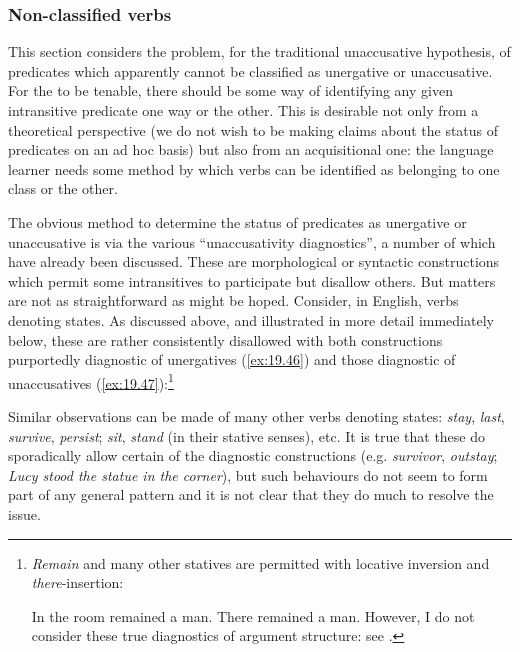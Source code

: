 \documentclass[output=paper]{langsci/langscibook}
\begin{document}
\subsubsection{Non-classified verbs}\label{sec:baker:3.4.4}

This section considers the problem, for the traditional unaccusative
hypothesis, of predicates which apparently cannot be classified as unergative
or unaccusative. For the  to be tenable, there should be
some way of identifying any given intransitive predicate one way or the other.
This is desirable not only from a theoretical perspective (we do not wish to be
making claims about the status of predicates on an ad hoc basis) but also from
an acquisitional one: the language learner needs some method by which verbs can
be identified as belonging to one class or the other.

The obvious method to determine the status of predicates as unergative or
unaccusative is via the various \enquote{unaccusativity diagnostics}, a number
of which have already been discussed. These are morphological or syntactic
constructions which permit some intransitives to participate but disallow
others. But matters are not as straightforward as might be hoped. Consider, in
English, verbs denoting states. As discussed above, and illustrated in more
detail immediately below, these are rather consistently disallowed with both
constructions purportedly diagnostic of unergatives (\ref{ex:19.46}) and those
diagnostic of unaccusatives (\ref{ex:19.47}):\footnote{\emph{Remain} and many other
    statives are permitted with locative inversion and
    \emph{there}{}-insertion:

\ea In the room remained a man.
\ex There remained a man.\z
However, I do not consider these true diagnostics of argument structure: see
\textcites[Ch.\ 6]{LevinRappaportHovav1995,Baker2018,Baker2019}.}

\ea\label{ex:19.46}
    \z
\z

\ea\label{ex:19.47}

    \z
\z
Similar observations can be made of many other verbs denoting states:
\emph{stay}, \emph{last}, \emph{survive}, \emph{persist}; \emph{sit},
\emph{stand} (in their stative senses), etc. It is true that these do
sporadically allow certain of the diagnostic constructions (e.g.
\emph{survivor}, \emph{outstay}; \emph{Lucy stood the statue in the corner}),
but such behaviours do not seem to form part of any general pattern and it is
not clear that they do much to resolve the issue.
\end{document}
